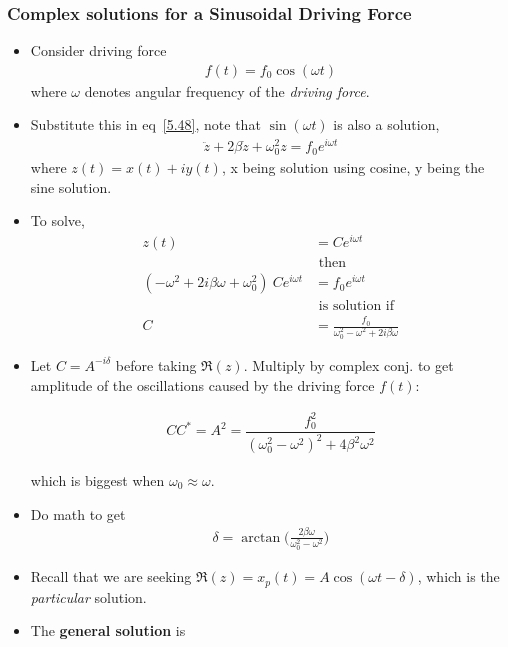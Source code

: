 \documentclass[10pt, twocolumn]{article}
\DeclareRobustCommand{\mybox}[2][gray!20]{%
	\begin{tcolorbox}[   %
		breakable,
		left=0pt,
		right=0pt,
		top=-13pt,
		bottom=0pt,
		colback=#1,
		colframe=#1,
		width=0.45\dimexpr\textwidth\relax,
		enlarge left by=0mm,
		boxsep=1pt,
		arc=0pt,outer arc=0pt,
		]
		#2
	\end{tcolorbox}
}
\begin{document}
\subsubsection{Complex solutions for a Sinusoidal Driving Force}
\begin{itemize}
	\item Consider driving force
	\begin{align}
	\tag{5.56}
		f(t) = f_0 \cos(\omega t)
	\label{5.56}
	\end{align}
	where $\omega$ denotes angular frequency of the \textit{driving force}. 
	\item Substitute this in eq~\ref{5.48}, note that $\sin(\omega t)$ is also a solution, 
	\begin{align}
	\tag{5.60}
		\ddot{z} + 2 \beta \dot{z} + \omega_0^2 z = f_0 e^{i\omega t}
	\label{5.60}
	\end{align}
	where $z(t) = x(t) + iy(t)$, x being solution using cosine, y being the sine solution. 
	\item To solve,
	\begin{align}
		z(t) &= C e^{i\omega t} \\ &\text{ then} \\
		(-\omega^2 + 2 i \beta \omega + \omega_0^2)~C e^{i\omega t} &= f_0 e^{i \omega t} \\ &\text{ is solution if} \\
		C &= \frac{f_0}{ \omega_0^2 -\omega^2 + 2 i \beta \omega }
	\end{align}
	\item Let $C = A^{-i\delta}$ before taking $\Re(z)$. Multiply by complex conj. to get amplitude of the oscillations caused by the driving force $f(t)$: \mybox[gray!20]{
		\begin{align} \tag{5.64}
			CC^* = A^2 = \dfrac{f_0^2}{(\omega_0^2 - \omega^2)^2 + 4 \beta^2 \omega^2}
		\label{5.64}
		\end{align}}
	which is biggest when $\omega_0 \approx \omega$. 
	\item Do math to get 
	\begin{align}\tag{5.65}
		\delta = \arctan\bigg(\frac{2 \beta \omega}{\omega_0^2 - \omega^2}\bigg)
		\label{5.65}
	\end{align}
	\item Recall that we are seeking $\Re(z) = x_p(t) = A \cos(\omega t - \delta)$, which is the \emph{particular} solution. 
	\item The \textbf{general solution} is 
	\begin{align}
	\tag{5.67}

\end{align}
\end{itemize}
\end{document}
